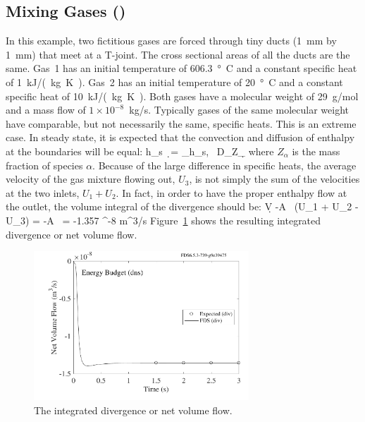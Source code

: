 \documentclass[11pt]{book}
\begin{document}
\subsection{Mixing Gases (\texorpdfstring{}{energy\_budget\_dns})}
\label{energy_budget_dns_100}

In this example, two fictitious gases are forced through tiny ducts (1~mm by 1~mm) that meet at a T-joint. The cross sectional areas of all the ducts are the same. Gas~1 has an initial temperature of 606.3~\si{\degree C} and a constant specific heat of 1~\si{kJ/(kg.K)}. Gas~2 has an initial temperature of 20~\si{\degree C} and a constant specific heat of 10~\si{kJ/(kg.K)}. Both gases have a molecular weight of 29~g/mol and a mass flow of $1 \times 10^{-8}$~kg/s. Typically gases of the same molecular weight have comparable, but not necessarily the same, specific heats. This is an extreme case. In steady state, it is expected that the convection and diffusion of enthalpy at the boundaries will be equal:
\be \int h_{\rm s} \, \rho \bu \cdot \d\bS = \sum_\alpha \int h_{s,\alpha} \, \rho D_\alpha \nabla Z_\alpha \cdot \d\bS \ee
where $Z_\alpha$ is the mass fraction of species $\alpha$. Because of the large difference in specific heats, the average velocity of the gas mixture flowing out, $U_3$, is not simply the sum of the velocities at the two inlets, $U_1+U_2$. In fact, in order to have the proper enthalpy flow at the outlet, the volume integral of the divergence should be:
\be \int \nabla \cdot \bu \; \d V \equiv -A \, (U_1 + U_2 - U_3) = -A \,  = -1.357 ^{-8} \; \hbox{m}^3/\hbox{s} \label{div2} \ee
Figure~\ref{energy_budget_dns} shows the resulting integrated divergence or net volume flow.

\begin{figure}[ht]
\centering
\includegraphics[height=2.2in]{SCRIPT_FIGURES/energy_budget_dns_div}
\caption[The  test case]{The integrated divergence or net volume flow.}
\label{energy_budget_dns}
\end{figure}
\end{document}
